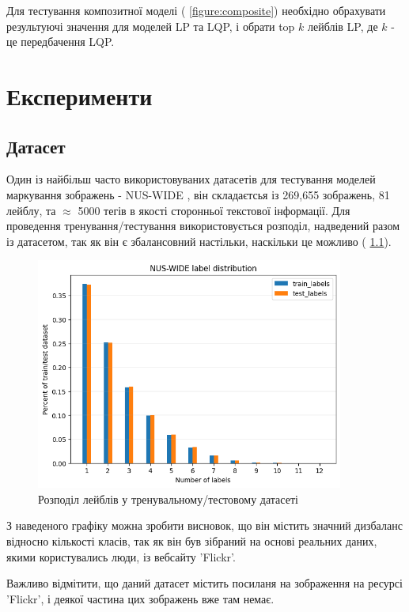 \documentclass{udstu}
\begin{document}
Для тестування композитної моделі (\figurename{ \ref{figure:composite}})
необхідно обрахувати результуючі значення для моделей LP та LQP, і обрати
top $k$ лейблів LP, де $k$ - це передбачення LQP.


\chapter{Експерименти}

\section{Датасет}

Один із найбільш часто використовуваних датасетів для тестування моделей маркування зображень - NUS-WIDE \cite{nus-wide-civr09},
він складаєтсья із 269,655 зображень, 81 лейблу, та $\approx$ 5000 тегів в якості сторонньої текстової інформації.
Для проведення тренування/тестування використовується розподіл, надведений разом із
датасетом, так як він є збалансовний настільки, наскільки це можливо (\figurename{ \ref{figure:nus-wide-dist}}).

\begin{figure}[!ht]
	\centering
	\includegraphics[width=0.9\textwidth]{PNG/nus-wide-label-dist}
	\caption{Розподіл лейблів у тренувальному/тестовому датасеті}
	\label{figure:nus-wide-dist}
\end{figure}

З наведеного графіку можна зробити висновок, що він містить значний дизбаланс відносно кількості класів,
так як він був зібраний на основі реальних даних, якими користувались люди, із вебсайту 'Flickr'.

Важливо відмітити, що даний датасет містить посиланя на зображення на ресурсі 'Flickr', і деякої частина цих
зображень вже там немає.
\end{document}
